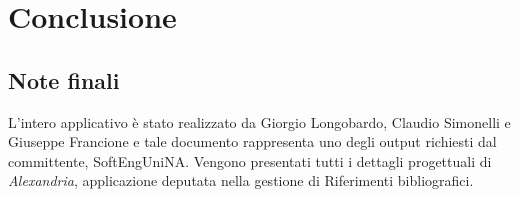 \chapter{Conclusione}
\raggedright{\section{Note finali}}
L'intero applicativo è stato realizzato da Giorgio Longobardo, Claudio Simonelli e Giuseppe Francione e tale documento rappresenta uno degli output richiesti dal committente, SoftEngUniNA. Vengono presentati tutti i dettagli progettuali di \textit{Alexandria}, applicazione deputata nella gestione di Riferimenti bibliografici. 